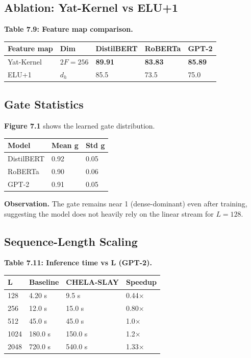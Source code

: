 \subsection{Ablation: Yat-Kernel vs ELU+1}

\textbf{Table 7.9: Feature map comparison.}

\begin{table}[H]
\centering
\small
\begin{tabular}{lllll}
\toprule
\textbf{Feature map} & \textbf{Dim} & \textbf{DistilBERT} & \textbf{RoBERTa} & \textbf{GPT-2} \\
\midrule
Yat-Kernel & $2F = 256 $ & \textbf{89.91} & \textbf{83.83} & \textbf{85.89} \\
ELU+1 & $d_h$ & 85.5 & 73.5 & 75.0 \\
\bottomrule
\end{tabular}
\end{table}

\subsection{Gate Statistics}

\textbf{Figure 7.1} shows the learned gate distribution.

\begin{table}[H]
\centering
\small
\begin{tabular}{lll}
\toprule
\textbf{Model} & \textbf{Mean g} & \textbf{Std g} \\
\midrule
DistilBERT & 0.92 & 0.05 \\
RoBERTa & 0.90 & 0.06 \\
GPT-2 & 0.91 & 0.05 \\
\bottomrule
\end{tabular}
\end{table}

\textbf{Observation.} The gate remains near 1 (dense-dominant) even after training, 
suggesting the model does not heavily rely on the linear stream for 
$L = 128$.

\subsection{Sequence-Length Scaling}

\textbf{Table 7.11: Inference time vs L (GPT-2).}

\begin{table}[H]
\centering
\small
\begin{tabular}{llll}
\toprule
\textbf{L} & \textbf{Baseline} & \textbf{CHELA-SLAY} & \textbf{Speedup} \\
\midrule
128 & 4.20 s & 9.5 s & 0.44$\times$ \\
256 & 12.0 s & 15.0 s & 0.80$\times$ \\
512 & 45.0 s & 45.0 s & 1.0$\times$ \\
1024 & 180.0 s & 150.0 s & 1.2$\times$ \\
2048 & 720.0 s & 540.0 s & 1.33$\times$ \\
\bottomrule
\end{tabular}
\end{table}

